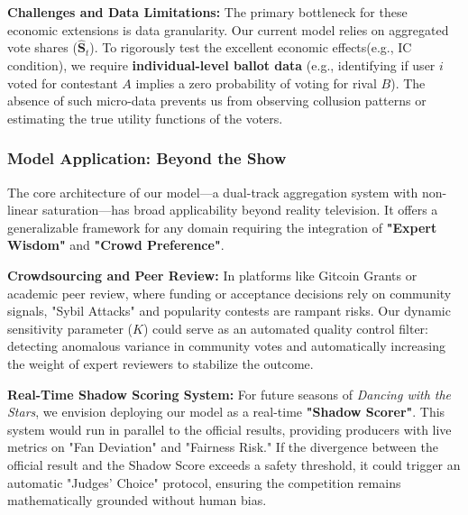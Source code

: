\textbf{Challenges and Data Limitations:}
The primary bottleneck for these economic extensions is data granularity. Our current model relies on aggregated vote shares ($\hat{\mathbf{S}}_t$). To rigorously test the excellent economic effects(e.g., IC condition), we require \textbf{individual-level ballot data} (e.g., identifying if user $i$ voted for contestant $A$ implies a zero probability of voting for rival $B$). The absence of such micro-data prevents us from observing collusion patterns or estimating the true utility functions of the voters.

\subsubsection{Model Application: Beyond the Show}

The core architecture of our model—a dual-track aggregation system with non-linear saturation—has broad applicability beyond reality television. It offers a generalizable framework for any domain requiring the integration of \textbf{"Expert Wisdom"} and \textbf{"Crowd Preference"}.

\textbf{Crowdsourcing and Peer Review:}
In platforms like Gitcoin Grants or academic peer review, where funding or acceptance decisions rely on community signals, "Sybil Attacks" and popularity contests are rampant risks. Our dynamic sensitivity parameter ($K$) could serve as an automated quality control filter: detecting anomalous variance in community votes and automatically increasing the weight of expert reviewers to stabilize the outcome.

\textbf{Real-Time Shadow Scoring System:}
For future seasons of \textit{Dancing with the Stars}, we envision deploying our model as a real-time \textbf{"Shadow Scorer"}. This system would run in parallel to the official results, providing producers with live metrics on "Fan Deviation" and "Fairness Risk." If the divergence between the official result and the Shadow Score exceeds a safety threshold, it could trigger an automatic "Judges' Choice" protocol, ensuring the competition remains mathematically grounded without human bias.